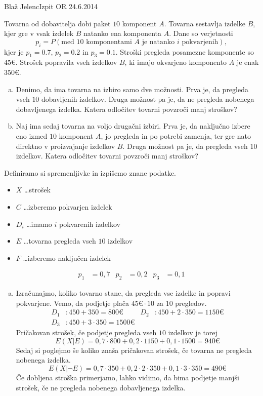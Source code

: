 \begin{naloga}{Blaž Jelenc}{Izpit OR 24.6.2014}
\begin{vprasanje}
Tovarna od dobavitelja dobi paket $10$ komponent $A$.
Tovarna sestavlja izdelke $B$,
kjer gre v vsak izdelek $B$ natanko ena komponenta $A$.
Dane so verjetnosti
$$
p_i = P(\text{med $10$ komponentami $A$ je natanko $i$ pokvarjenih}),
$$
kjer je $p_1 = 0.7$, $p_2 = 0.2$ in $p_3 = 0.1$.
Stroški pregleda posamezne komponente so $45 €$.
Strošek popravila vseh izdelkov $B$, ki imajo okvarjeno komponento $A$
je enak $350 €$.
\begin{enumerate}[(a)]
\item Denimo, da ima tovarna na izbiro samo dve možnosti.
Prva je, da pregleda vseh $10$ dobavljenih izdelkov.
Druga možnost pa je, da ne pregleda nobenega dobavljenega izdelka.
Katera odločitev tovarni povzroči manj stroškov?

\item Naj ima sedaj tovarna na voljo drugačni izbiri.
Prva je, da naključno izbere eno izmed $10$ komponent $A$,
jo pregleda in po potrebi zamenja,
ter gre nato direktno v proizvajanje izdelkov $B$.
Druga možnost pa je, da pregleda vseh $10$ izdelkov.
Katera odločitev tovarni povzroči manj stroškov?
\end{enumerate}
\end{vprasanje}
\begin{odgovor}
Definiramo si spremenljivke in izpišemo znane podatke.
\begin{itemize}
\item[] $X$ \dots strošek
\item[] $C$ \dots izberemo pokvarjen izdelek
\item[] $D_i$ \dots imamo $i$ pokvarenih izdelkov
\item[] $E$ \dots tovarna pregleda vseh $10$ izdelkov
\item[] $F$ \dots izberemo naključen izdelek
\end{itemize}
\begin{align*}
p_1 &= 0,7 & p_2 &= 0,2 & p_3 &= 0,1
\end{align*}

\begin{enumerate}[(a)]
\item Izračunajmo, koliko tovarno stane, da pregleda vse izdelke in popravi pokvarjene. Vemo, da podjetje plača $45 € \cdot 10$ za $10$ pregledov.
\begin{align*}
D_1 &: 450 + 350 = 800 €&
D_2&: 450 + 2 \cdot 350 = 1150 €\\
D_3&: 450 + 3 \cdot 350 = 1500 €
\end{align*}
Pričakovan strošek, če podjetje pregleda vseh $10$ izdelkov je torej
$$
E(X|E) = 0,7 \cdot 800 + 0,2 \cdot 1150 + 0,1 \cdot 1500 = 940 €
$$
Sedaj si poglejmo še koliko znaša pričakovan strošek, če tovarna ne pregleda nobenega izdelka. 
$$
E(X|\neg E) = 0,7 \cdot 350 + 0,2 \cdot 2 \cdot 350 + 0,1 \cdot 3 \cdot 350 = 490 €
$$
Če dobljena stroška primerjamo, lahko vidimo, da bima podjetje manjši strošek, če ne pregleda nobenega dobavljenega izdelka.


\end{enumerate}
\end{odgovor}
\end{naloga}
